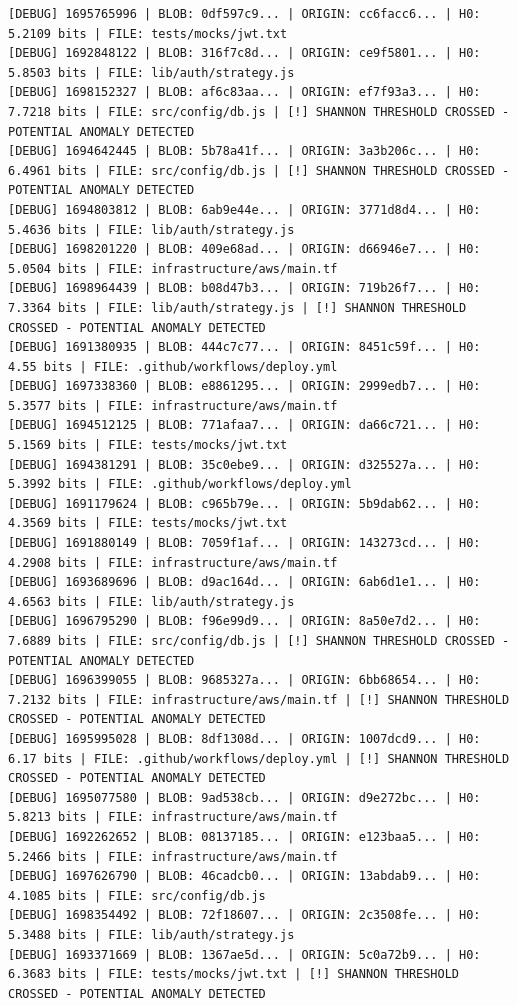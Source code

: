 \documentclass[12pt, a4paper, oneside]{report}
\begin{document}
\begin{lstlisting}[basicstyle=\tiny\ttfamily]
[DEBUG] 1695765996 | BLOB: 0df597c9... | ORIGIN: cc6facc6... | H0: 5.2109 bits | FILE: tests/mocks/jwt.txt
[DEBUG] 1692848122 | BLOB: 316f7c8d... | ORIGIN: ce9f5801... | H0: 5.8503 bits | FILE: lib/auth/strategy.js
[DEBUG] 1698152327 | BLOB: af6c83aa... | ORIGIN: ef7f93a3... | H0: 7.7218 bits | FILE: src/config/db.js | [!] SHANNON THRESHOLD CROSSED - POTENTIAL ANOMALY DETECTED
[DEBUG] 1694642445 | BLOB: 5b78a41f... | ORIGIN: 3a3b206c... | H0: 6.4961 bits | FILE: src/config/db.js | [!] SHANNON THRESHOLD CROSSED - POTENTIAL ANOMALY DETECTED
[DEBUG] 1694803812 | BLOB: 6ab9e44e... | ORIGIN: 3771d8d4... | H0: 5.4636 bits | FILE: lib/auth/strategy.js
[DEBUG] 1698201220 | BLOB: 409e68ad... | ORIGIN: d66946e7... | H0: 5.0504 bits | FILE: infrastructure/aws/main.tf
[DEBUG] 1698964439 | BLOB: b08d47b3... | ORIGIN: 719b26f7... | H0: 7.3364 bits | FILE: lib/auth/strategy.js | [!] SHANNON THRESHOLD CROSSED - POTENTIAL ANOMALY DETECTED
[DEBUG] 1691380935 | BLOB: 444c7c77... | ORIGIN: 8451c59f... | H0: 4.55 bits | FILE: .github/workflows/deploy.yml
[DEBUG] 1697338360 | BLOB: e8861295... | ORIGIN: 2999edb7... | H0: 5.3577 bits | FILE: infrastructure/aws/main.tf
[DEBUG] 1694512125 | BLOB: 771afaa7... | ORIGIN: da66c721... | H0: 5.1569 bits | FILE: tests/mocks/jwt.txt
[DEBUG] 1694381291 | BLOB: 35c0ebe9... | ORIGIN: d325527a... | H0: 5.3992 bits | FILE: .github/workflows/deploy.yml
[DEBUG] 1691179624 | BLOB: c965b79e... | ORIGIN: 5b9dab62... | H0: 4.3569 bits | FILE: tests/mocks/jwt.txt
[DEBUG] 1691880149 | BLOB: 7059f1af... | ORIGIN: 143273cd... | H0: 4.2908 bits | FILE: infrastructure/aws/main.tf
[DEBUG] 1693689696 | BLOB: d9ac164d... | ORIGIN: 6ab6d1e1... | H0: 4.6563 bits | FILE: lib/auth/strategy.js
[DEBUG] 1696795290 | BLOB: f96e99d9... | ORIGIN: 8a50e7d2... | H0: 7.6889 bits | FILE: src/config/db.js | [!] SHANNON THRESHOLD CROSSED - POTENTIAL ANOMALY DETECTED
[DEBUG] 1696399055 | BLOB: 9685327a... | ORIGIN: 6bb68654... | H0: 7.2132 bits | FILE: infrastructure/aws/main.tf | [!] SHANNON THRESHOLD CROSSED - POTENTIAL ANOMALY DETECTED
[DEBUG] 1695995028 | BLOB: 8df1308d... | ORIGIN: 1007dcd9... | H0: 6.17 bits | FILE: .github/workflows/deploy.yml | [!] SHANNON THRESHOLD CROSSED - POTENTIAL ANOMALY DETECTED
[DEBUG] 1695077580 | BLOB: 9ad538cb... | ORIGIN: d9e272bc... | H0: 5.8213 bits | FILE: infrastructure/aws/main.tf
[DEBUG] 1692262652 | BLOB: 08137185... | ORIGIN: e123baa5... | H0: 5.2466 bits | FILE: infrastructure/aws/main.tf
[DEBUG] 1697626790 | BLOB: 46cadcb0... | ORIGIN: 13abdab9... | H0: 4.1085 bits | FILE: src/config/db.js
[DEBUG] 1698354492 | BLOB: 72f18607... | ORIGIN: 2c3508fe... | H0: 5.3488 bits | FILE: lib/auth/strategy.js
[DEBUG] 1693371669 | BLOB: 1367ae5d... | ORIGIN: 5c0a72b9... | H0: 6.3683 bits | FILE: tests/mocks/jwt.txt | [!] SHANNON THRESHOLD CROSSED - POTENTIAL ANOMALY DETECTED
\end{lstlisting}
\end{document}
